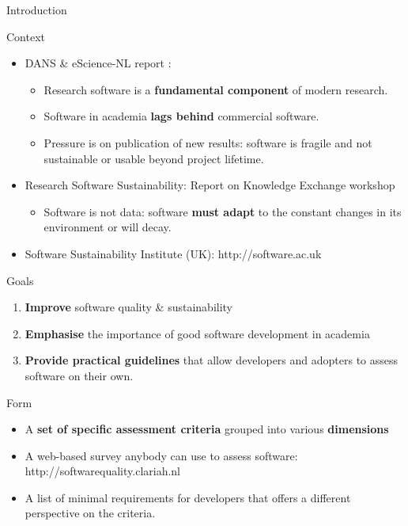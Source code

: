 \documentclass[compress]{beamer}
\begin{document}
\begin{frame}{Introduction}
    \begin{block}{Context}
        \begin{itemize}
        \item DANS \& eScience-NL report \citep{RESEARCHSOFTWARE}:
        \begin{itemize}
            \item Research software is a \textbf{fundamental component} of modern research.
            \item Software in academia \textbf{lags behind} commercial software.
            \item Pressure is on publication of new results: software is fragile
                and not sustainable or usable beyond project lifetime.
        \end{itemize}
        \item Research Software Sustainability: Report on Knowledge Exchange workshop
        \begin{itemize}
            \item Software is not data: software \textbf{must adapt} to the constant changes in its environment or will decay.
        \end{itemize}
        \item Software Sustainability Institute (UK): http://software.ac.uk
        \end{itemize}
    \end{block}
\end{frame}

\begin{frame}
    \begin{block}{Goals}
        \begin{enumerate}
            \item \textbf{Improve} software quality \& sustainability
            \item \textbf{Emphasise} the importance of good software development in academia
            \item \textbf{Provide practical guidelines} that allow developers and adopters to assess software on their own.
        \end{enumerate}
    \end{block}
    \begin{block}{Form}
        \begin{itemize}
            \item A \textbf{set of specific assessment criteria} grouped into various \textbf{dimensions}
            \item A web-based survey anybody can use to assess software:
                http://softwarequality.clariah.nl
            \item A list of minimal requirements for developers that offers a
                different perspective on the criteria.
        \end{itemize}
    \end{block}
\end{frame}
\end{document}
